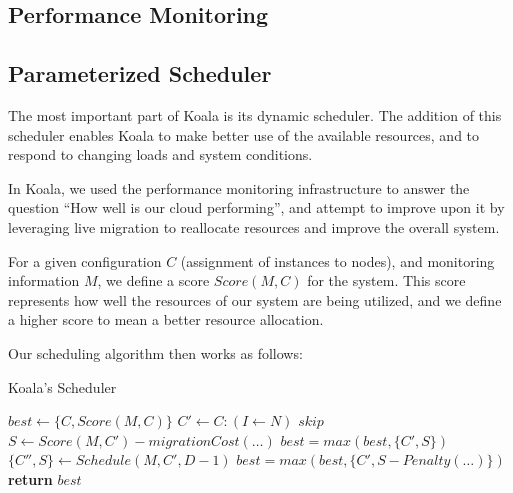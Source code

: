 \subsection{Performance Monitoring}

\subsection{Parameterized Scheduler}

The most important part of Koala is its dynamic scheduler.  The addition of this
scheduler enables Koala to make better use of the available resources, and to
respond to changing loads and system conditions.

In Koala, we used the performance monitoring infrastructure to answer the
question ``How well is our cloud performing'', and attempt to improve upon it by
leveraging live migration to reallocate resources and improve the overall
system.

For a given configuration $C$ (assignment of instances to nodes), and
monitoring information $M$, we define a score $Score(M,C)$ for the system.  This
score represents how well the resources of our system are being utilized, and we
define a higher score to mean a better resource allocation.

Our scheduling algorithm then works as follows:

\begin{algorithm}
\caption{Koala's Scheduler}
\label{algo:sched}
\footnotesize
\begin{algorithmic}
    \State $best \gets \{C,Score(M,C)\}$%
        \State $C' \gets C : (I \gets N)$
            \State $skip$
        \EndIf
        \State $S \gets Score(M,C') - migrationCost(\dots)$
        \State $best = max(best,\{C',S\})$
        \State $\{C'',S\} \gets Schedule(M,C',D-1)$
        \State $best = max(best,\{C', S - Penalty(\dots)\})$
        \EndIf
    \EndFor
    \State \textbf{return} $best$
\EndProcedure
\end{algorithmic}
\normalsize
\end{algorithm}

